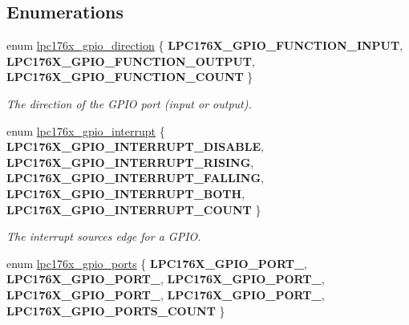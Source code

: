 \subsection*{Enumerations}
\begin{DoxyCompactItemize}
\item 
enum \mbox{\hyperlink{gpio-defs_8h_a0c9e959ab33ca3965f03caf07c8ecc17}{lpc176x\+\_\+gpio\+\_\+direction}} \{ {\bfseries L\+P\+C176\+X\+\_\+\+G\+P\+I\+O\+\_\+\+F\+U\+N\+C\+T\+I\+O\+N\+\_\+\+I\+N\+P\+UT}, 
{\bfseries L\+P\+C176\+X\+\_\+\+G\+P\+I\+O\+\_\+\+F\+U\+N\+C\+T\+I\+O\+N\+\_\+\+O\+U\+T\+P\+UT}, 
{\bfseries L\+P\+C176\+X\+\_\+\+G\+P\+I\+O\+\_\+\+F\+U\+N\+C\+T\+I\+O\+N\+\_\+\+C\+O\+U\+NT}
 \}
\begin{DoxyCompactList}\small\item\em The direction of the G\+P\+IO port (input or output). \end{DoxyCompactList}\item 
enum \mbox{\hyperlink{gpio-defs_8h_afc30bf25b9862f6272f1bab077f8016b}{lpc176x\+\_\+gpio\+\_\+interrupt}} \{ \newline
{\bfseries L\+P\+C176\+X\+\_\+\+G\+P\+I\+O\+\_\+\+I\+N\+T\+E\+R\+R\+U\+P\+T\+\_\+\+D\+I\+S\+A\+B\+LE}, 
{\bfseries L\+P\+C176\+X\+\_\+\+G\+P\+I\+O\+\_\+\+I\+N\+T\+E\+R\+R\+U\+P\+T\+\_\+\+R\+I\+S\+I\+NG}, 
{\bfseries L\+P\+C176\+X\+\_\+\+G\+P\+I\+O\+\_\+\+I\+N\+T\+E\+R\+R\+U\+P\+T\+\_\+\+F\+A\+L\+L\+I\+NG}, 
{\bfseries L\+P\+C176\+X\+\_\+\+G\+P\+I\+O\+\_\+\+I\+N\+T\+E\+R\+R\+U\+P\+T\+\_\+\+B\+O\+TH}, 
\newline
{\bfseries L\+P\+C176\+X\+\_\+\+G\+P\+I\+O\+\_\+\+I\+N\+T\+E\+R\+R\+U\+P\+T\+\_\+\+C\+O\+U\+NT}
 \}
\begin{DoxyCompactList}\small\item\em The interrupt sources edge for a G\+P\+IO. \end{DoxyCompactList}\item 
enum \mbox{\hyperlink{gpio-defs_8h_a22c7c5bfd737b9395b232cfb69bde3e9}{lpc176x\+\_\+gpio\+\_\+ports}} \{ \newline
{\bfseries L\+P\+C176\+X\+\_\+\+G\+P\+I\+O\+\_\+\+P\+O\+R\+T\+\_}, 
{\bfseries L\+P\+C176\+X\+\_\+\+G\+P\+I\+O\+\_\+\+P\+O\+R\+T\+\_}, 
{\bfseries L\+P\+C176\+X\+\_\+\+G\+P\+I\+O\+\_\+\+P\+O\+R\+T\+\_}, 
{\bfseries L\+P\+C176\+X\+\_\+\+G\+P\+I\+O\+\_\+\+P\+O\+R\+T\+\_}, 
\newline
{\bfseries L\+P\+C176\+X\+\_\+\+G\+P\+I\+O\+\_\+\+P\+O\+R\+T\+\_}, 
{\bfseries L\+P\+C176\+X\+\_\+\+G\+P\+I\+O\+\_\+\+P\+O\+R\+T\+S\+\_\+\+C\+O\+U\+NT}
 \}

\end{DoxyCompactItemize}

